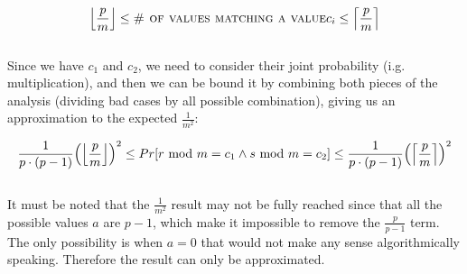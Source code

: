 \documentclass[a4paper]{article}
\begin{document}
\[
\Bigl \lfloor \frac{p}{m} \Bigr \rfloor \le \textsc{\# of values matching a value} c_i \le \Bigl \lceil \frac{p}{m} \Bigr\rceil
\]
\qquad \\
Since we have $c_1$ and $c_2$, we need to consider their joint probability (i.g. multiplication), and then we can be bound it by combining both pieces of the analysis (dividing bad cases by all possible combination), giving us an approximation to the expected $\frac{1}{m^2}$:

$$
\frac{1}{p\cdot(p-1)}\Bigl(\Bigl\lfloor\frac{p}{m}\Bigr\rfloor\Bigr)^2  \le {Pr}[r \text{ mod } m = c_1 \wedge s \text{ mod } m  = c_2] \le \frac{1}{p\cdot(p-1)}\Bigl(\Bigl\lceil\frac{p}{m}\Bigr\rceil\Bigr)^2 
$$
\qquad \\
It must be noted that the $\frac{1}{m^2}$ result may not be fully reached since that all the possible values $a$ are $p-1$, which make it impossible to remove the $\frac{p}{p-1}$ term. The only possibility is when $a = 0$ that would not make any sense algorithmically speaking. Therefore the result can only be approximated.
\end{document}
